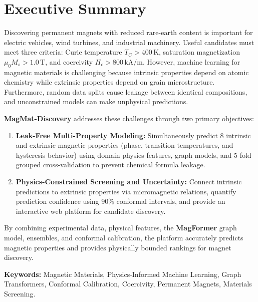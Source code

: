 \documentclass[11pt,a4paper]{article}
\begin{document}
\section*{Executive Summary}

Discovering permanent magnets with reduced rare-earth content is important for electric vehicles, wind turbines, and industrial machinery. Useful candidates must meet three criteria: Curie temperature $T_C > 400\,\text{K}$, saturation magnetization $\mu_0 M_s > 1.0\,\text{T}$, and coercivity $H_c > 800\,\text{kA/m}$. However, machine learning for magnetic materials is challenging because intrinsic properties depend on atomic chemistry while extrinsic properties depend on grain microstructure. Furthermore, random data splits cause leakage between identical compositions, and unconstrained models can make unphysical predictions.

\textbf{MagMat-Discovery} addresses these challenges through two primary objectives:
\begin{enumerate}[leftmargin=1.5em]
    \item \textbf{Leak-Free Multi-Property Modeling:} Simultaneously predict 8 intrinsic and extrinsic magnetic properties (phase, transition temperatures, and hysteresis behavior) using domain physics features, graph models, and 5-fold grouped cross-validation to prevent chemical formula leakage.
    \item \textbf{Physics-Constrained Screening and Uncertainty:} Connect intrinsic predictions to extrinsic properties via micromagnetic relations, quantify prediction confidence using 90\% conformal intervals, and provide an interactive web platform for candidate discovery.
\end{enumerate}

By combining experimental data, physical features, the \textbf{MagFormer} graph model, ensembles, and conformal calibration, the platform accurately predicts magnetic properties and provides physically bounded rankings for magnet discovery.

\vspace{0.4cm}
\noindent\textbf{Keywords:} Magnetic Materials, Physics-Informed Machine Learning, Graph Transformers, Conformal Calibration, Coercivity, Permanent Magnets, Materials Screening.
\end{document}
